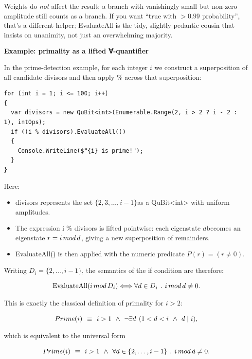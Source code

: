\documentclass[a4paper,11pt]{article}
\begin{document}
Weights do \emph{not} affect the result: a branch with vanishingly small but non-zero amplitude still counts as a branch. If you want ``true with \(> 0.99\) probability'', that's a different helper; EvaluateAll is the tidy, slightly pedantic cousin that insists on unanimity, not just an overwhelming majority.

\textbf{Example: primality as a lifted ∀-quantifier}

In the prime-detection example, for each integer \(i\) we construct a superposition of all candidate divisors and then apply \% across that superposition:\parencite{Pau251}

\begin{lstlisting}[style=codeblock]
for (int i = 1; i <= 100; i++)
{
  var divisors = new QuBit<int>(Enumerable.Range(2, i > 2 ? i - 2 : 1), intOps);
  if ((i % divisors).EvaluateAll())
  {
    Console.WriteLine($"{i} is prime!");
  }
}
\end{lstlisting}

Here:

\begin{itemize}
\item
  divisors represents the set \(\{ 2,3,\ldots,i - 1\}\)as a QuBit\textless int\textgreater{} with uniform amplitudes.
\item
  The expression i \% divisors is lifted pointwise: each eigenstate \(d\)becomes an eigenstate \(r = i\text{\,}mod\text{\,}d\), giving a new superposition of remainders.
\item
  EvaluateAll() is then applied with the numeric predicate \(P(r) = (r \neq 0)\).
\end{itemize}

Writing \(D_{i} = \{ 2,\ldots,i - 1\}\), the semantics of the if condition are therefore:

\[\text{EvaluateAll}(i\text{\,}mod\text{\,}D_{i}) \Longleftrightarrow \forall d \in D_{i}\text{\:\,}.\text{\:\,}i\text{\,}mod\text{\,}d \neq 0.
\]

This is exactly the classical definition of primality for \(i > 2\):

\[Prime(i)\text{\:\,} \equiv \text{\:\,}i > 1\text{\:\,} \land \text{\:\,}\neg\exists d\text{\:\,}(1 < d < i\text{\:\,} \land \text{\:\,}d \mid i),
\]

which is equivalent to the universal form

\[Prime(i)\text{\:\,} \equiv \text{\:\,}i > 1\text{\:\,} \land \text{\:\,}\forall d \in \{ 2,\ldots,i - 1\}\text{\:\,}.\text{\:\,}i\text{\,}mod\text{\,}d \neq 0.
\]
\end{document}
